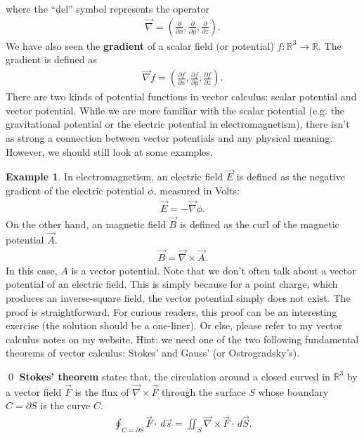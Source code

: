\documentclass{book}
\theoremstyle{definition}
\newtheorem{exmp}{Example}[section]
\begin{document}
where the ``del'' symbol represents the operator
\begin{align*}
\vec{\nabla} = \left( \frac{\partial }{\partial x} , \frac{\partial }{\partial y} , \frac{\partial }{\partial z} \right). 
\end{align*}
We have also seen the \textbf{gradient} of a scalar field (or potential) $f : \mathbb{R}^3 \rightarrow \mathbb{R}$. The gradient is defined as
\begin{align*}
\vec{\nabla}f = \left( \frac{\partial f}{\partial x} , \frac{\partial f }{\partial y} , \frac{\partial f}{\partial z}\right) .
\end{align*}
There are two kinds of potential functions in vector calculus: scalar potential and vector potential. While we are more familiar with the scalar potential (e.g. the gravitational potential or the electric potential in electromagnetism), there isn't as strong a connection between vector potentials and any physical meaning. However, we should still look at some examples. 
\begin{exmp}
In electromagnetism, an electric field $\vec{E}$ is defined as the negative gradient of the electric potential $\phi$, measured in Volts:
\begin{align*}
\vec{E} = -\vec{\nabla}\phi.
\end{align*}
On the other hand, an magnetic field $\vec{B}$ is defined as the curl of the magnetic potential $\vec{A}$.
\begin{align*}
\vec{B} = \vec{\nabla}\times\vec{A}.
\end{align*}
In this case, $A$ is a vector potential. Note that we don't often talk about a vector potential of an electric field. This is simply because for a point charge, which produces an inverse-square field, the vector potential simply does not exist. The proof is straightforward. For curious readers, this proof can be an interesting exercise (the solution should be a one-liner). Or else, please refer to my vector calculus notes on my website. Hint: we need one of the two following fundamental theorems of vector calculus: Stokes' and Gauss' (or Ostrogradsky's).
\end{exmp}\qed
\textbf{Stokes' theorem} states that, the circulation around a closed curved in $\mathbb{R}^3$ by a vector field $\vec{F}$ is the flux of $\vec{\nabla}\times\vec{F}$ through the surface $S$ whose boundary $C = \partial S$ is the curve $C$.
\begin{align*}\boxed{
\oint_{C = \partial S} \vec{F}\cdot\,d\vec{s} = \iint_{S} \vec{\nabla}\times \vec{F} \cdot\,d\vec{S}.}
\end{align*}
\end{document}
